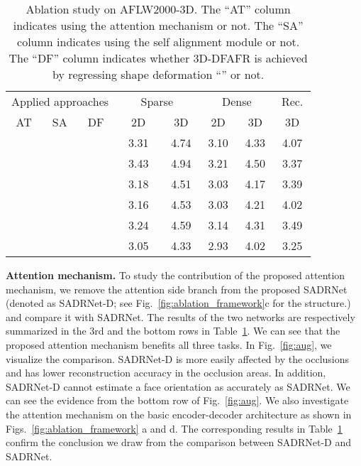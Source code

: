 \documentclass[journal]{IEEEtran}
\begin{document}
	\begin{table}[tbp]
		\caption{Ablation study on AFLW2000-3D. The ``AT'' column indicates using the attention mechanism or not. The ``SA'' column indicates using the self alignment module or not. The ``DF'' column indicates
			whether 3D-DFAFR is achieved by regressing shape deformation ``'' or not.}
		\label{tab:ablation}
		\centering
		\begin{tabular}{|c|c|c|c|c|c|c|c|}
			\hline
			\multicolumn{3}{|c|}{Applied approaches} & \multicolumn{2}{c|}{Sparse} & \multicolumn{2}{c|}{Dense} & {Rec.} \\ \cline{1-8}
			AT    &   SA    &          DF          & ~~2D~~ &        ~3D~        & ~2D~ &        ~3D~         &  ~3D~  \\ \hline
			&         &                      &  3.31  &        4.74        & 3.10 &        4.33         &  4.07  \\
			&         &               &  3.43  &        4.94        & 3.21 &        4.50         &  3.37  \\
			&  &               &  3.18  &        4.51        & 3.03 &        4.17         &  3.39  \\
			 &         &                      &  3.16  &        4.53        & 3.03 &        4.21         &  4.02  \\
			 &  &                      &  3.24  &        4.59        & 3.14 &        4.31         &  3.49  \\
			 &  &               &  3.05  &        4.33        & 2.93 &        4.02         &  3.25  \\ \hline
		\end{tabular}
		\vspace{-1\baselineskip}
	\end{table}
	
	
	
	
	
	
	{\noindent\bf Attention mechanism.}
	To study the contribution of the proposed attention mechanism, we remove the attention side branch
	from the proposed SADRNet (denoted as SADRNet-D; see Fig.~\ref{fig:ablation_framework}c for the structure.) and compare it with SADRNet. The results of the two networks are respectively summarized in the 3rd and the bottom rows in Table~\ref{tab:ablation}. We can see that the proposed attention mechanism benefits all three tasks.
	In Fig.~\ref{fig:aug}, we visualize the comparison. SADRNet-D is more easily affected by the occlusions and has lower reconstruction accuracy in the occlusion areas.
	In addition, SADRNet-D cannot estimate a face orientation as accurately as SADRNet.
	We can see the evidence from the bottom row of Fig.~\ref{fig:aug}.
	We also investigate the attention mechanism on the basic encoder-decoder architecture as shown in
	Figs.~\ref{fig:ablation_framework} a and d. The corresponding results in Table~\ref{tab:ablation} confirm
	the conclusion we draw from the comparison between SADRNet-D and SADRNet.
	
\end{document}
